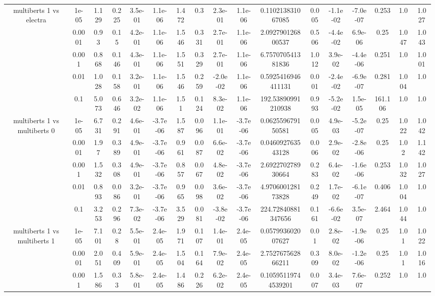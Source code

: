 \begin{tabular}{|c|c|c|c|c|c|c|c|c|c|c|c|c|c|c|c|c|}
\hline
\multirow{5}{*}{multiberts 1 vs electra } & 1e-05 & 1.129 & 0.225 & 3.5e-01 & 1.1e-06 & 1.472 & 0.3 & 2.3e-01 & 1.1e-06 & 0.110213831067085 & 0.005 & -1.1e-02 & -7.0e-07 & 0.253 & 1.0 & 1.027 \\
 & 0.0001 & 0.93 & 0.15 & 4.2e-01 & 1.1e-06 & 1.546 & 0.331 & 2.7e-01 & 1.1e-06 & 2.092790126800537 & 0.506 & -4.4e-02 & 6.9e-06 & 0.25 & 1.047 & 1.043 \\
 & 0.001 & 0.868 & 0.146 & 4.3e-01 & 1.1e-06 & 1.551 & 0.329 & 2.7e-01 & 1.1e-06 & 6.757070541381836 & 1.012 & 3.9e-02 & -4.4e-06 & 0.251 & 1.0 & 1.001 \\
 & 0.01 & 1.028 & 0.158 & 3.2e-01 & 1.1e-06 & 1.546 & 0.259 & -2.0e-02 & 1.1e-06 & 0.5925416946411131 & 0.001 & -2.4e-02 & -6.9e-07 & 0.281 & 1.004 & 1.0 \\
 & 0.1 & 5.073 & 0.646 & 3.2e-02 & 1.1e-06 & 1.51 & 0.124 & 8.3e-02 & 1.1e-06 & 192.53890991210938 & 0.993 & -5.2e-02 & 1.5e-05 & 161.106 & 1.0 & 1.0 \\
\hline
\multirow{5}{*}{multiberts 1 vs multiberts 0} & 1e-05 & 6.731 & 0.291 & 4.6e-01 & -3.7e-06 & 1.587 & 0.096 & 1.1e-01 & -3.7e-06 & 0.062559679150581 & 0.005 & 4.9e-03 & -5.2e-07 & 0.25 & 1.022 & 1.042 \\
 & 0.0001 & 1.97 & 0.389 & 4.9e-01 & -3.7e-06 & 0.961 & 0.087 & 6.6e-02 & -3.7e-06 & 0.046092763543128 & 0.006 & 2.9e-02 & -2.8e-06 & 0.25 & 1.02 & 1.142 \\
 & 0.001 & 1.532 & 0.308 & 4.9e-01 & -3.7e-06 & 0.857 & 0.067 & 4.8e-02 & -3.7e-06 & 2.692270278930664 & 0.283 & 6.4e-02 & -1.6e-06 & 0.253 & 1.032 & 1.027 \\
 & 0.01 & 0.893 & 0.086 & 3.2e-01 & -3.7e-06 & 0.965 & 0.098 & 3.6e-02 & -3.7e-06 & 4.970600128173828 & 0.249 & 1.7e-02 & -6.1e-07 & 0.406 & 1.004 & 1.0 \\
 & 0.1 & 3.253 & 0.296 & 7.3e-02 & -3.7e-06 & 3.529 & 0.081 & -3.8e-02 & -3.7e-06 & 224.72840881347656 & 0.161 & -6.6e-02 & 3.5e-07 & 2.464 & 1.044 & 1.0 \\
\hline
\multirow{5}{*}{multiberts 1 vs multiberts 1} & 1e-05 & 7.101 & 0.28 & 5.5e-01 & 2.4e-05 & 1.971 & 0.107 & 1.4e-01 & 2.4e-05 & 0.057993602007627 & 0.01 & 2.8e-02 & -1.9e-06 & 0.25 & 1.01 & 1.022 \\
 & 0.0001 & 2.051 & 0.409 & 5.9e-01 & 2.4e-05 & 1.504 & 0.164 & 7.9e-02 & 2.4e-05 & 2.752767562866211 & 0.309 & 8.0e-02 & -1.2e-06 & 0.25 & 1.01 & 1.016 \\
 & 0.001 & 1.586 & 0.33 & 5.8e-01 & 2.4e-05 & 1.486 & 0.226 & 6.2e-02 & 2.4e-05 & 0.10595119744539201 & 0.007 & 3.4e-03 & 7.6e-07 & 0.252 & 1.0 & 1.0 \\

\end{tabular}
